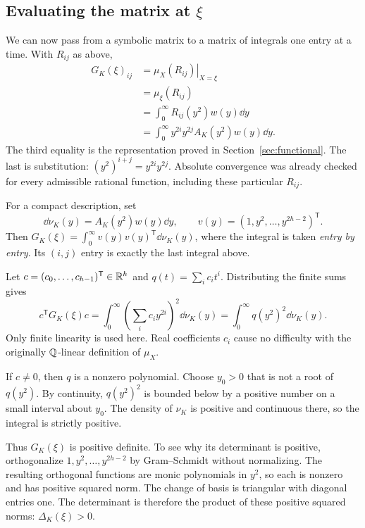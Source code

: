 \subsection{Evaluating the matrix at \texorpdfstring{\(\xi\)}{xi}}
We can now pass from a symbolic matrix to a matrix of integrals one entry
at a time. With $R_{ij}$ as above,
\begin{align*}
 G_K(\xi)_{ij}
 &=\left.\mu_X(R_{ij})\right|_{X=\xi}\\
 &=\mu_\xi(R_{ij})\\
 &=\int_0^\infty R_{ij}(y^2)w(y)\dd y\\
 &=\int_0^\infty y^{2i}y^{2j}A_K(y^2)w(y)\dd y.
\end{align*}
The third equality is the representation proved in Section~\ref{sec:functional}.
The last is substitution: $(y^2)^{i+j}=y^{2i}y^{2j}$.
Absolute convergence was already checked for every admissible rational
function, including these particular $R_{ij}$.

For a compact description, set
\[
 \dd\nu_K(y)=A_K(y^2)w(y)\dd y,\qquad
 v(y)=(1,y^2,\ldots,y^{2h-2})^{\mathsf T}.
\]
Then $G_K(\xi)=\int_0^\infty v(y)v(y)^{\mathsf T}\dd\nu_K(y)$,
where the integral is taken \emph{entry by entry}. Its $(i,j)$ entry is
exactly the last integral above.

Let $c=(c_0,\ldots,c_{h-1})^{\mathsf T}\in\mathbb R^h$ and
$q(t)=\sum_i c_it^i$. Distributing the finite sums gives
\[
 c^{\mathsf T}G_K(\xi)c
 =\int_0^\infty\left(\sum_i c_iy^{2i}\right)^2\dd\nu_K(y)
 =\int_0^\infty q(y^2)^2\dd\nu_K(y).
\]
Only finite linearity is used here. Real coefficients $c_i$ cause no
difficulty with the originally $\mathbb Q$-linear definition of $\mu_X$.

If $c\ne0$, then $q$ is a nonzero polynomial. Choose $y_0>0$ that is not
a root of $q(y^2)$. By continuity, $q(y^2)^2$ is bounded below by a positive
number on a small interval about $y_0$. The density of $\nu_K$ is positive
and continuous there, so the integral is strictly positive.

Thus $G_K(\xi)$ is positive definite. To see why its determinant is positive,
orthogonalize $1,y^2,\ldots,y^{2h-2}$ by Gram--Schmidt without normalizing.
The resulting orthogonal functions are monic polynomials in $y^2$, so each
is nonzero and has positive squared norm. The change of basis is triangular
with diagonal entries one. The determinant is therefore the product of
these positive squared norms: $\Delta_K(\xi)>0$.

